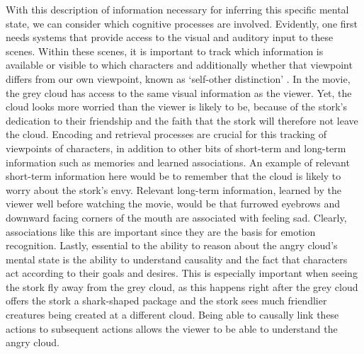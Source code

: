 With this description of information necessary for inferring this specific mental state, we can consider which cognitive processes are involved. Evidently, one first needs systems that provide access to the visual and auditory input to these scenes. Within these scenes, it is important to track which information is available or visible to which characters and additionally whether that viewpoint differs from our own viewpoint, known as `self-other distinction' \citep{quesque2020}. In the movie, the grey cloud has access to the same visual information as the viewer. Yet, the cloud looks more worried than the viewer is likely to be, because of the stork's dedication to their friendship and the faith that the stork will therefore not leave the cloud. Encoding and retrieval processes are crucial for this tracking of viewpoints of characters, in addition to other bits of short-term and long-term information such as memories and learned associations. An example of relevant short-term information here would be to remember that the cloud is likely to worry about the stork's envy. Relevant long-term information, learned by the viewer well before watching the movie, would be that furrowed eyebrows and downward facing corners of the mouth are associated with feeling sad. Clearly, associations like this are important since they are the basis for emotion recognition. Lastly, essential to the ability to reason about the angry cloud's mental state is the ability to understand causality and the fact that characters act according to their goals and desires. This is especially important when seeing the stork fly away from the grey cloud, as this happens right after the grey cloud offers the stork a shark-shaped package and the stork sees much friendlier creatures being created at a different cloud. Being able to causally link these actions to subsequent actions allows the viewer to be able to understand the angry cloud.

